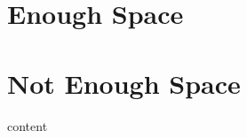 \documentclass{book}
\begin{document}
\tableofcontents
\section{Enough Space}
\clearpage
\setcounter{page}{1000}
\section{Not Enough Space}
content
\end{document}
